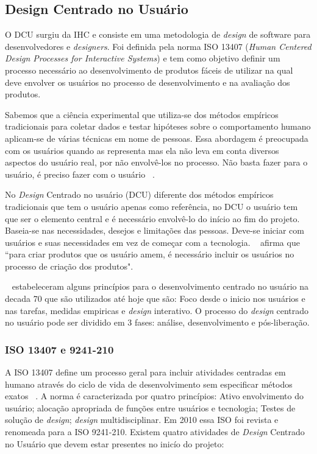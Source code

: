 \subsection{Design Centrado no Usuário}

O DCU surgiu da IHC e consiste em uma metodologia de \emph{design} de software para desenvolvedores e \emph{designers}. Foi definida pela norma ISO 13407 (\textit{Human Centered Design Processes for Interactive Systems}) e tem como objetivo definir um processo necessário ao desenvolvimento de produtos fáceis de utilizar na qual deve envolver os usuários no processo de desenvolvimento e na avaliação dos produtos.

Sabemos que a ciência experimental que utiliza-se dos métodos empíricos tradicionais para coletar dados e testar hipóteses sobre o comportamento humano aplicam-se de várias técnicas em nome de pessoas. Essa abordagem é preocupada com os usuários quando as representa mas ela não leva em conta diversos aspectos do usuário real, por não envolvê-los no processo. Não basta fazer para o usuário, é preciso fazer com o usuário ~\cite{eason1995}. 

No \emph{Design} Centrado no usuário (DCU) diferente dos métodos empíricos tradicionais que tem o usuário apenas como  referência, no DCU o usuário tem que ser o elemento central e é necessário envolvê-lo do início ao fim do projeto. Baseia-se nas necessidades, desejos e limitações das pessoas. Deve-se iniciar com usuários e suas necessidades em vez de começar com a tecnologia. ~ afirma que ``para criar produtos que os usuário amem, é necessário incluir os usuários no processo de criação dos produtos". 

~ estabeleceram alguns princípios para o desenvolvimento centrado no usuário na decada 70 que são utilizados até hoje que são: Foco desde o inicio nos usuários e nas tarefas, medidas empiricas e \emph{design} interativo. O processo do \emph{design} centrado no usuário pode ser dividido em 3 fases: análise, desenvolvimento e pós-liberação. 


\subsubsection{ISO 13407 e 9241-210}
	
A ISO 13407 define um processo geral para incluir atividades centradas em humano através do ciclo de vida de desenvolvimento sem especificar métodos exatos ~\cite{santos2012}.
%
A norma é caracterizada por quatro princípios: Ativo envolvimento do usuário; alocação apropriada de funções entre usuários e tecnologia; Testes de solução de \emph{design}; \emph{design} multidisciplinar. Em 2010 essa ISO foi revista e renomeada para a ISO 9241-210.
%
Existem quatro atividades de \emph{Design} Centrado no Usuário que devem estar presentes no inicío do projeto:

